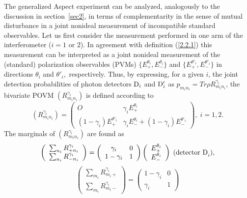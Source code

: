 \documentclass{ws-procs975x65}
\begin{document}
{The generalized Aspect experiment can be analyzed, analogously to
the discussion in section~\ref{sec2}, in terms of complementarity
in the sense of mutual disturbance in a joint nonideal measurement
of incompatible standard observables. Let us first consider the
measurement performed in one arm of the interferometer ($i=1$ or
$2$). In agreement with definition (\ref{2.2.1}) this measurement
can be interpreted as a joint nonideal measurement of the
(standard) polarization observables (PVMs)
$\{{E}^{\theta_i}_+,{E}^{\theta_i}_-\}$ and
$\{{E}^{\theta'_i}_+,{E}^{\theta'_i}_-\}$ in directions $\theta_i$
and $\theta'_i,$ respectively. Thus, by expressing, for a given
$i$, the joint detection probabilities of photon detectors ${\rm
D}_i$ and ${\rm D}'_i$ as $p_{m_in_i}=Tr \rho
R^{\gamma_i}_{m_in_i}$, the bivariate POVM
$(R^{\gamma_i}_{m_in_i})$ is defined according to
\begin{equation}\label{12}(R^{\gamma_i}_{m_in_i}) = \left(
\begin{array}{cc}
O & \gamma_i E^{\theta_i}_+\\
(1-\gamma_i)E^{\theta'_i}_+ &  \gamma_i E^{\theta_i}_- + (1 -
\gamma_i) E^{\theta'_i}_-
\end{array} \right),\;i=1,2.\end{equation}
The marginals of $(R^{\gamma_i}_{m_in_i})$ are found as
 \begin{equation}\label{8}\left(
\begin{array}{c} \sum_{n_i} {R}^{\gamma_i}_{+n_i}\\ \sum_{n_i} {R}^{\gamma_i}_{-n_i}
\end{array} \right)  =
\left( \begin{array}{cc} \gamma_i & 0 \\ 1-\gamma_i  & 1
\end{array} \right)
\left( \begin{array}{c} {E}^{\theta_i}_{+} \\ {E}^{\theta_i}_{-}
\end{array} \right)\; \mbox{\rm (detector D}_i ),\end{equation}
 \begin{equation}\label{9} \left( \begin{array}{c} \sum_{m_i} {R}^{\gamma_i}_{m_i+}\\ \sum_{m_i} {R}^{\gamma_i}_{m_i-}
\end{array} \right) =
\left( \begin{array}{cc} 1-\gamma_i & 0 \\ \gamma_i & 1
\end{array} \right)

\end{equation}}
\end{document}
